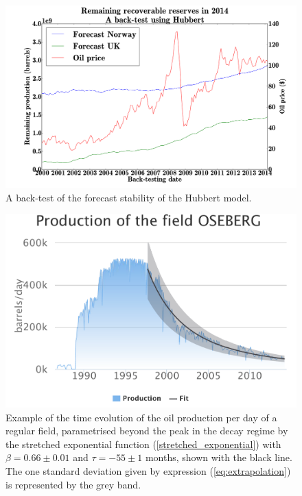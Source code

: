 \documentclass[review]{elsarticle}
\begin{document}




\newpage{}

\noindent 
\begin{figure}[H]
\includegraphics[width=1\columnwidth]{hubbert-backtest}
\caption{A back-test of the forecast stability of the Hubbert model.}
\label{hubbert-backtest} 
\end{figure}

\pagebreak

\noindent 
\begin{figure}[H]
\includegraphics[width=1\columnwidth]{oseberg}
\caption{Example of the time evolution of the oil production per day of
a regular field, parametrised beyond the peak in the decay
regime by the stretched exponential 
function (\ref{stretched_exponential}) with $\beta=0.66\pm0.01$ and $\tau=-55\pm1$ months,
shown with the black line.  The one standard deviation given by expression
(\ref{eq:extrapolation}) is represented by the grey band.}
\label{regular} 
\end{figure}
\end{document}
